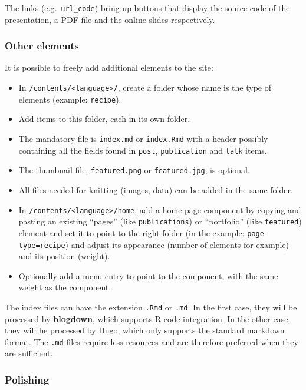 \documentclass[
  12pt,
  american,
  a4paper,
  extrafontsizes,onecolumn,openright
  ]{memoir}
\providecommand{\tightlist}{%
  \setlength{\itemsep}{0pt}\setlength{\parskip}{0pt}}
\begin{document}
The links (e.g.~\texttt{url\_code}) bring up buttons that display the source code of the presentation, a PDF file and the online slides respectively.

\subsubsection{Other elements}\label{other-elements}

It is possible to freely add additional elements to the site:

\begin{itemize}
\tightlist
\item
  In \texttt{/contents/\textless{}language\textgreater{}/}, create a folder whose name is the type of elements (example: \texttt{recipe}).
\item
  Add items to this folder, each in its own folder.
\item
  The mandatory file is \texttt{index.md} or \texttt{index.Rmd} with a header possibly containing all the fields found in \texttt{post}, \texttt{publication} and \texttt{talk} items.
\item
  The thumbnail file, \texttt{featured.png} or \texttt{featured.jpg}, is optional.
\item
  All files needed for knitting (images, data) can be added in the same folder.
\item
  In \texttt{/contents/\textless{}language\textgreater{}/home}, add a home page component by copying and pasting an existing \enquote{pages} (like \texttt{publications}) or \enquote{portfolio} (like \texttt{featured}) element and set it to point to the right folder (in the example: \texttt{page-type=recipe}) and adjust its appearance (number of elements for example) and its position (weight).
\item
  Optionally add a menu entry to point to the component, with the same weight as the component.
\end{itemize}

The index files can have the extension \texttt{.Rmd} or \texttt{.md}.
In the first case, they will be processed by \textbf{blogdown}, which supports R code integration.
In the other case, they will be processed by Hugo, which only supports the standard markdown format.
The \texttt{.md} files require less resources and are therefore preferred when they are sufficient.

\subsubsection{Polishing}\label{polishing}
\end{document}
